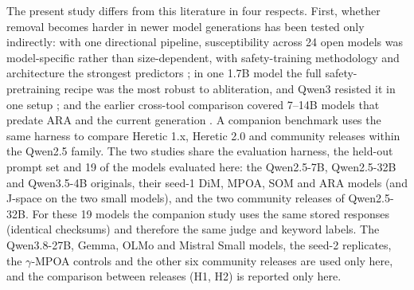 The present study differs from this literature in four respects. First,
whether removal becomes harder in newer model generations has been tested only
indirectly: with one directional pipeline, susceptibility across 24 open
models was model-specific rather than size-dependent, with safety-training
methodology and architecture the strongest predictors \cite{hadetskyi2026not};
in one 1.7B model the full safety-pretraining recipe was the most robust
to abliteration, and Qwen3 resisted it in one setup \cite{agnihotri2025granular}; and the earlier cross-tool comparison
covered 7--14B models that predate ARA and the current generation
\cite{young2025comparative}. A companion benchmark \cite{young2026paper30}
uses the same harness to compare Heretic 1.x, Heretic 2.0 and community
releases within the Qwen2.5 family. The two studies share the evaluation
harness, the held-out prompt set and 19 of the models evaluated here: the
Qwen2.5-7B, Qwen2.5-32B and Qwen3.5-4B originals, their seed-1 DiM, MPOA, SOM
and ARA models (and J-space on the two small models), and the two community
releases of Qwen2.5-32B. For these 19 models the companion study uses the same
stored responses (identical checksums) and therefore the same judge and
keyword labels. The Qwen3.8-27B, Gemma, OLMo and Mistral Small models, the
seed-2 replicates, the $\gamma$-MPOA controls and the other six community
releases are used only here, and the comparison between releases (H1, H2) is
reported only here.
